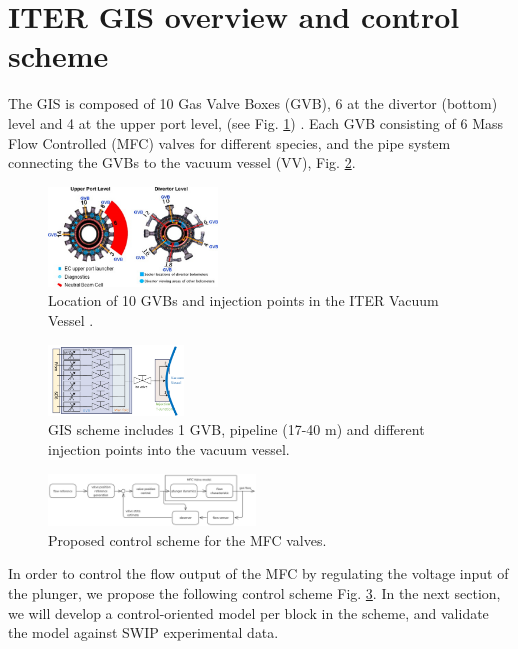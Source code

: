 \documentclass[letterpaper, 10pt, conference]{ieeeconf}
\begin{document}
\section{ITER GIS overview and control scheme}\label{sec:overview}
The GIS is composed of 10 Gas Valve Boxes (GVB),  6 at the divertor (bottom) level and 4 at the upper port level, (see Fig. \ref{fig:GIS}) \cite{GIS_2012}. Each GVB consisting of 6 Mass Flow Controlled (MFC) valves for different species, and the pipe system connecting the GVBs to the vacuum vessel (VV), Fig. \ref{fig:GIS_scheme}.
\begin{figure}[!ht]
     \centering
     \includegraphics[width=0.4\textwidth]{GIS_ip}
     \caption{Location of 10 GVBs and injection points in the ITER Vacuum Vessel \cite{GIS_2012}.}
     \label{fig:GIS}
\end{figure}
\begin{figure}[!ht]
     \centering
     \includegraphics[width=0.32\textwidth]{GIS_scheme.png}
     \caption{GIS scheme includes 1 GVB, pipeline (17-40 m) and different injection points into the vacuum vessel.}
     \label{fig:GIS_scheme}
\end{figure}
\begin{figure}[!ht]
    \centering
    \includegraphics[width=0.49\textwidth]{ctrl_scheme}
    \caption{Proposed control scheme for the MFC valves.}
    \label{fig:ctrlscheme}
\end{figure}

In order to control the flow output of the MFC by regulating the voltage input of the plunger, we propose the following control scheme Fig. \ref{fig:ctrlscheme}. In the next section, we will develop a control-oriented model per block in the scheme, and validate the model against SWIP experimental data.
\end{document}
